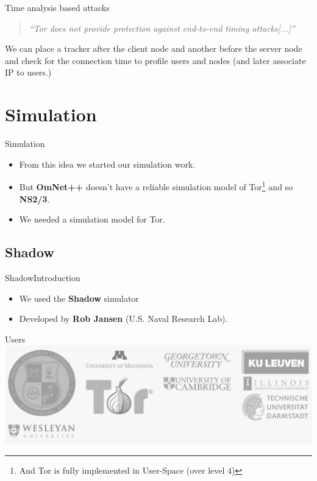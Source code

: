 \begin{frame}{Time analysis based attacks}{}
	\begin{quote}
		\emph{``Tor does not provide protection against end-to-end timing attacks[...]''}
	\end{quote}
	We can place a tracker after the client node and another before the server node
	and check for the connection time to profile users and nodes (and later associate IP to users.)
\end{frame}

\section{Simulation}
\begin{frame}{Simulation}{}
	\begin{itemize}
		\item From this idea we started our simulation work.
		\item But \textbf{OmNet++} doesn't have a reliable simulation
		      model of Tor\footnote{And Tor is fully implemented in
		      User-Space (over level 4)} and so \textbf{NS2/3}.
		\item We needed a simulation model for Tor.
	\end{itemize}
\end{frame}

\subsection{Shadow}
\begin{frame}{Shadow}{Introduction}
	\begin{itemize}
		\item We used the \textbf{Shadow} simulator
		\item Developed by \textbf{Rob Jansen} (U.S. Naval Research Lab).
	\end{itemize}
	\begin{block}{Users}
		\includegraphics[width=\textwidth]{img/shadow-users.png}
	\end{block}
\end{frame}

